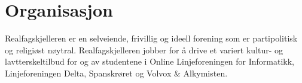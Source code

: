\section{Organisasjon} \label{organisasjon}

Realfagskjelleren er en selveiende, frivillig og ideell forening som er partipolitisk og religiøst nøytral.
Realfagskjelleren jobber for å drive et variert kultur- og lavtterskeltilbud for og av studentene i Online Linjeforeningen for Informatikk, Linjeforeningen Delta, Spanskrøret og Volvox \& Alkymisten.